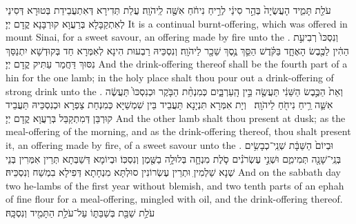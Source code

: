 {עֹלַ֖ת תָּמִ֑יד הָעֲשֻׂיָה֙ בְּהַ֣ר סִינַ֔י לְרֵ֣יחַ נִיחֹ֔חַ אִשֶּׁ֖ה לַֽיהֹוָֽה׃
}
{עֲלַת תְּדִירָא דְּאִתְעֲבֵידַת בְּטוּרָא דְּסִינַי לְאִתְקַבָּלָא בְּרַעֲוָא קוּרְבָּנָא קֳדָם יְיָ׃}
{It is a continual burnt-offering, which was offered in mount Sinai, for a sweet savour, an offering made by fire unto the \lord.}{}
{וְנִסְכּוֹ֙ רְבִיעִ֣ת הַהִ֔ין לַכֶּ֖בֶשׂ הָאֶחָ֑ד בַּקֹּ֗דֶשׁ הַסֵּ֛ךְ נֶ֥סֶךְ שֵׁכָ֖ר לַיהֹוָֽה׃
}
{וְנִסְכֵּיהּ רַבְעוּת הִינָא לְאִמְּרָא חַד בְּקוּדְשָׁא יִתְנַסַּךְ נִסּוּךְ דַּחֲמַר עַתִּיק קֳדָם יְיָ׃}
{And the drink-offering thereof shall be the fourth part of a hin for the one lamb; in the holy place shalt thou pour out a drink-offering of strong drink unto the \lord.}{}
{וְאֵת֙ הַכֶּ֣בֶשׂ הַשֵּׁנִ֔י תַּעֲשֶׂ֖ה בֵּ֣ין הָֽעַרְבָּ֑יִם כְּמִנְחַ֨ת הַבֹּ֤קֶר וּכְנִסְכּוֹ֙ תַּעֲשֶׂ֔ה אִשֵּׁ֛ה רֵ֥יחַ נִיחֹ֖חַ לַיהֹוָֽה׃ \petucha 
{}}
{וְיָת אִמְּרָא תִּנְיָנָא תַּעֲבֵיד בֵּין שִׁמְשַׁיָּא כְּמִנְחַת צַפְרָא וּכְנִסְכֵּיהּ תַּעֲבֵיד קוּרְבַּן דְּמִתְקַבַּל בְּרַעֲוָא קֳדָם יְיָ׃}
{And the other lamb shalt thou present at dusk; as the meal-offering of the morning, and as the drink-offering thereof, thou shalt present it, an offering made by fire, of a sweet savour unto the \lord.}{}
{וּבְיוֹם֙ הַשַּׁבָּ֔ת שְׁנֵֽי־כְבָשִׂ֥ים בְּנֵֽי־שָׁנָ֖ה תְּמִימִ֑ם וּשְׁנֵ֣י עֶשְׂרֹנִ֗ים סֹ֧לֶת מִנְחָ֛ה בְּלוּלָ֥ה בַשֶּׁ֖מֶן וְנִסְכּֽוֹ׃}
{וּבְיוֹמָא דְּשַׁבְּתָא תְּרֵין אִמְּרִין בְּנֵי שְׁנָא שַׁלְמִיןִ וּתְרֵין עֶשְׂרוֹנִין סוּלְתָּא מִנְחָתָא דְּפִילָא בִמְשַׁח וְנִסְכֵּיהּ׃}
{And on the sabbath day two he-lambs of the first year without blemish, and two tenth parts of an ephah of fine flour for a meal-offering, mingled with oil, and the drink-offering thereof.}{}
{עֹלַ֥ת שַׁבַּ֖ת בְּשַׁבַּתּ֑וֹ עַל־עֹלַ֥ת הַתָּמִ֖יד וְנִסְכָּֽהּ׃ \petucha 
{}}
